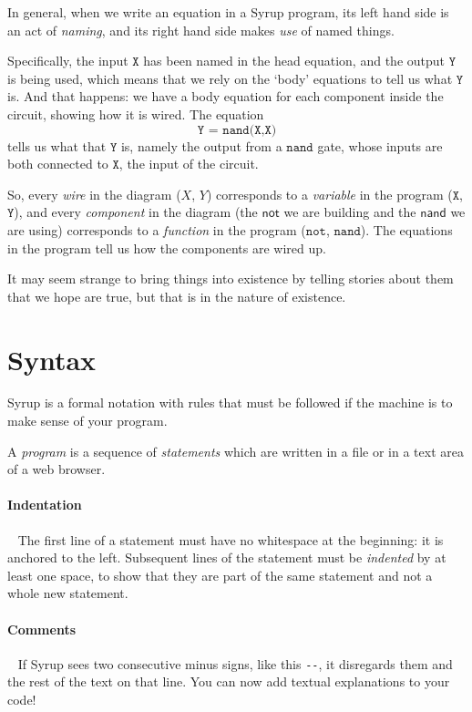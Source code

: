 \documentclass{article}
\begin{document}
In general, when we write an equation in a Syrup program, its left hand
side is an act of \emph{naming}, and its right hand side makes \emph{use} of
named things.

Specifically, the input $\texttt{X}$ has been named in the head equation,
and the output $\texttt{Y}$ is being used, which means that we rely on the
`body' equations to tell us what $\texttt{Y}$ is. And that happens: we have a
body equation for each component inside the circuit, showing how it is wired.
The equation
\[
  \texttt{Y = nand(X,X)}
\]
tells us what that $\texttt{Y}$ is, namely the output from a $\texttt{nand}$
gate, whose inputs are both connected to $\texttt{X}$, the input of the
circuit.

So, every \emph{wire} in the diagram ($X$, $Y$) corresponds to a \emph{variable}
in the program ($\texttt{X}$, $\texttt{Y}$), and every \emph{component} in the
diagram (the $\mathsf{not}$ we are building and the $\mathsf{nand}$ we are
using) corresponds to a \emph{function} in the program ($\texttt{not}$, $\texttt{nand}$).
The equations in the program tell us how the components are wired up.

It may seem strange to bring things into existence by telling stories about them
that we hope are true, but that is in the nature of existence.


\section{Syntax}

\newcommand{\Bit}{\texttt{<Bit>}}
\newcommand{\cab}[1]{\texttt{[}#1\texttt{]}}
\newcommand{\pa}[1]{\texttt{(}#1\texttt{)}}
\newcommand{\NT}[1]{\langle\mathit{#1}\rangle}

Syrup is a formal notation with rules that must be followed if the machine is to make sense of your program.

A \emph{program} is a sequence of \emph{statements} which are written in a file or in a text area of a web browser.

\paragraph{Indentation}~ The first line of a statement must have no
whitespace at the beginning: it is anchored to the left. Subsequent
lines of the statement must be \emph{indented} by at least one space,
to show that they are part of the same statement and not a whole new
statement.

\paragraph{Comments}~ If Syrup sees two consecutive minus signs, like
this \verb!--!, it disregards them and the rest of the text on that
line. You can now add textual explanations to your code!
\end{document}
